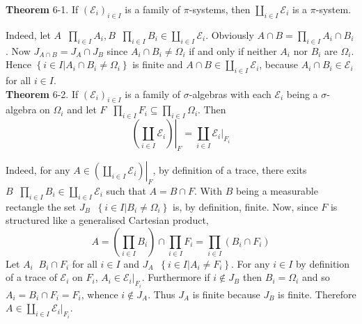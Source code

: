 \documentclass[a4paper]{article}
\newcommand{\obj}[1]{\left\{ #1 \right \}}
\newcommand{\brac}[1]{\left ( #1 \right )}
\newcommand{\induc}[1]{\left . #1 \right \vert}
\newcommand{\abs}[1]{\left | #1 \right |}
\newcommand{\Ecal}{\mathcal{E}}
\newcommand{\defn}{\mathop{\overset{\Delta}{=}}\nolimits}
\begin{document}
\label{thm:rectangle_pi_sys} \noindent \textbf{Theorem} 6-1.
If $\brac{\Ecal_i}_{i\in I}$ is a family of $\pi$-systems, then $\coprod_{i\in I} \Ecal_i$ is a $\pi$-system.

Indeed, let $A \defn \prod_{i\in I} A_i, B \defn \prod_{i\in I} B_i \in \coprod_{i\in I} \Ecal_i$. Obviously $A\cap B = \prod_{i\in I} A_i \cap B_i$. Now $J_{A\cap B} = J_A \cap J_B$ since $A_i \cap B_i \neq \Omega_i$ if and only if neither $A_i$ nor $B_i$ are $\Omega_i$. Hence $\obj{ \induc{ i\in I } A_i \cap B_i \neq \Omega_i }$ is finite and $A\cap B \in \coprod_{i\in I} \Ecal_i$, because $A_i\cap B_i \in \Ecal_i$ for all $i\in I$.\\


\label{thm:rectangle_trace} \noindent \textbf{Theorem} 6-2.
If $\brac{\Ecal_i}_{i\in I}$ is a family of $\sigma$-algebras with each $\Ecal_i$ being a $\sigma$-algebra on $\Omega_i$ and let $F\defn \prod_{i\in I} F_i \subseteq \prod_{i\in I} \Omega_i$. Then \[\induc{\brac{\coprod_{i\in I} \Ecal_i}}_F = \coprod_{i\in I} \induc{\Ecal_i}_{F_i}\]

Indeed, for any $A \in \induc{\brac{\coprod_{i\in I} \Ecal_i}}_F$, by definition of a trace, there exits $B\defn \prod_{i\in I} B_i\in \coprod_{i\in I} \Ecal_i$ such that $A = B \cap F$. With $B$ being a measurable rectangle the set $J_B\defn \obj{ \induc{ i\in I } B_i \neq \Omega_i }$ is, by definition, finite. Now, since $F$ is structured like a generalised Cartesian product, \[A = \brac{\prod_{i\in I} B_i} \cap \prod_{i\in I} F_i = \prod_{i\in I} \brac{B_i\cap F_i}\] Let $A_i\defn B_i\cap F_i$ for all $i\in I$ and $J_A\defn \obj{ \induc{ i\in I } A_i \neq F_i }$. For any $i\in I$ by definition of a trace of $\Ecal_i$ on $F_i$, $A_i\in \induc{\Ecal_i}_{F_i}$. Furthermore if $i\notin J_B$ then $B_i = \Omega_i$ and so $A_i = B_i\cap F_i = F_i$, whence $i\notin J_A$. Thus $J_A$ is finite because $J_B$ is finite. Therefore $A\in \coprod_{i\in I} \induc{\Ecal_i}_{F_i}$.
\end{document}
